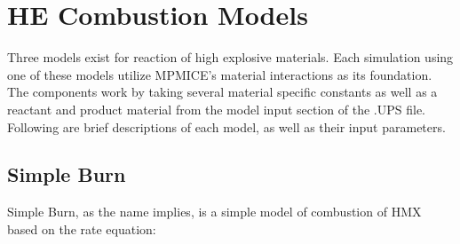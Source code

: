 

\section{HE Combustion Models}

Three models exist for reaction of high explosive materials.  Each simulation using one of these models utilize MPMICE's material interactions as its foundation.  The components work by taking several material specific constants as well as a reactant and product material from the model input section of the .UPS file.  Following are brief descriptions of each model, as well as their input parameters.

\subsection{Simple Burn} \label{Sec:SimpleBurn}

Simple Burn, as the name implies, is a simple model of combustion of HMX based on the rate equation:

